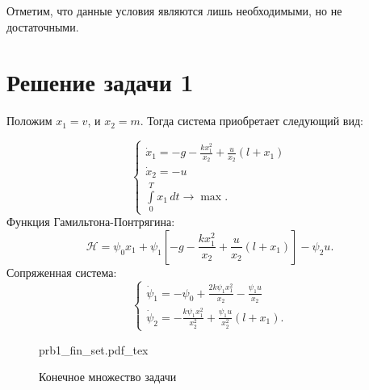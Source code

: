 \documentclass[12pt, a4paper]{article} %
\newcommand{\incfig}[1]{%
    \def\svgwidth{\columnwidth}
    {#1.pdf_tex}
}
\begin{document}
Отметим, что данные условия являются лишь необходимыми, но не достаточными.

\section{Решение задачи 1}



Положим $x_1 = v$, и $x_2 = m$. 
Тогда система приобретает следующий вид:

\begin{equation}
    \begin{cases}
        \displaystyle
        \dot x_1 = -g - \frac{kx_1^2}{x_2} + \frac{u}{x_2}(l + x_1) \\
        \dot x_2 = -u \\
        \displaystyle
        \int\limits_{0}^{T} x_1\,dt \rightarrow \max.
    \end{cases} 
\end{equation} 
Функция Гамильтона-Понтрягина:
\begin{equation}
    \mathscr{H} = \psi_0 x_1 +
    \psi_1 \left[ -g - \frac{kx_1^2}{x_2} + \frac{u}{x_2}(l + x_1) \right] -
    \psi_2 u
.\end{equation}
Сопряженная система:
\begin{equation}\label{eq:1_conj}
\begin{cases}
    \displaystyle
    \dot \psi_1 = -\psi_0 + \frac{2k\psi_1x_1^2}{x_2} -
        \frac{\psi_1 u}{x_2} \\
    \displaystyle
    \dot \psi_2 = -\frac{k\psi_1x_1^2}{x_2^2} +
        \frac{\psi_1u}{x_2^2}(l + x_1).
\end{cases}     
\end{equation}

\begin{figure}[ht]
    \centering
    \incfig{prb1_fin_set}
    \caption{Конечное множество задачи}
    \label{fig:prb1_fin_set}
\end{figure}
\end{document}
